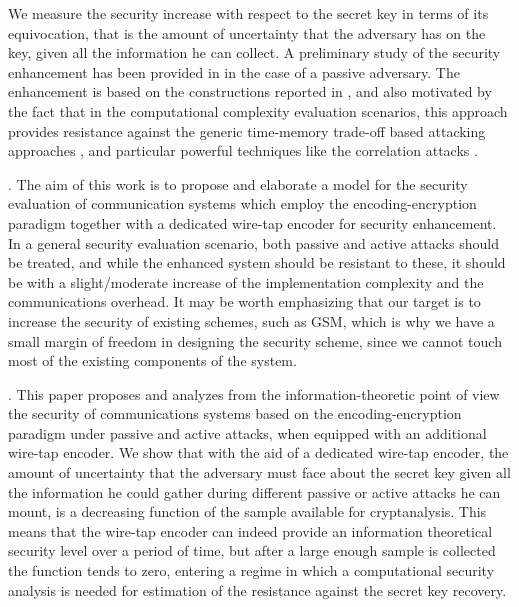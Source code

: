 \documentclass{article}[11pt]
\begin{document}
We measure the security increase with respect to the secret key in
terms of its equivocation, that is the amount of uncertainty that
the adversary has on the key, given all the information he can
collect. A preliminary study of the security enhancement has been
provided in \cite{misa&frederique} in the case of a passive
adversary. The enhancement is based on the constructions reported
in \cite{mihaljevic-Computimg2009,mihaljevic-IOSpress2009}, and
also motivated by the fact that in the computational complexity
evaluation scenarios, this approach provides resistance against
the generic time-memory trade-off based attacking approaches
\cite{hellman,mihaljevic-IEEE-CL-2007}, and particular powerful
techniques like the correlation attacks
\cite{fossorier-IEEE-IT-2007}.

\vspace*{0.25cm} . The aim
of this work is to propose and elaborate a model for the security
evaluation of communication systems which employ the
encoding-encryption paradigm together with a dedicated wire-tap
encoder for security enhancement. In a general security evaluation
scenario, both passive and active attacks should be treated, and
while the enhanced system should be resistant to these, it should
be with a slight/moderate increase of the implementation
complexity and the communications overhead. It may be worth
emphasizing that our target is to increase the security of
existing schemes, such as GSM, which is why we have a small margin
of freedom in designing the security scheme, since we cannot touch
most of the existing components of the system.

\vspace*{0.25cm} . This paper
proposes and analyzes from the information-theoretic point of view
the security of communications systems based on the
encoding-encryption paradigm under passive and active attacks,
when equipped with an additional wire-tap encoder. We show that
with the aid of a dedicated wire-tap encoder, the amount of
uncertainty that the adversary must face about the secret key
given all the information he could gather during different passive
or active attacks he can mount, is a decreasing function of the
sample available for cryptanalysis. This means that the wire-tap
encoder can indeed provide an information theoretical security
level over a period of time, but after a large enough sample is
collected the function tends to zero, entering a regime in which a
computational security analysis is needed for estimation of the
resistance against the secret key recovery.
\end{document}
